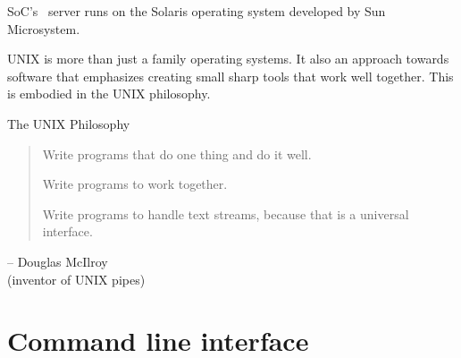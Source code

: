 SoC's \sunfire\ server runs on the Solaris operating system developed by Sun
Microsystem.  

UNIX is more than just a family operating systems. It also an approach towards
software that emphasizes creating small sharp tools that work well together.
This is embodied in the UNIX philosophy.   

\begin{frame}{The UNIX Philosophy}
\begin{quote}
Write programs that do one thing and do it well.

Write programs to work together.

Write programs to handle text streams, because that is a universal interface.
\end{quote}
\begin{flushright}
-- Douglas McIlroy\\(inventor of UNIX pipes)
\end{flushright}
\end{frame}

\section{Command line interface} %

